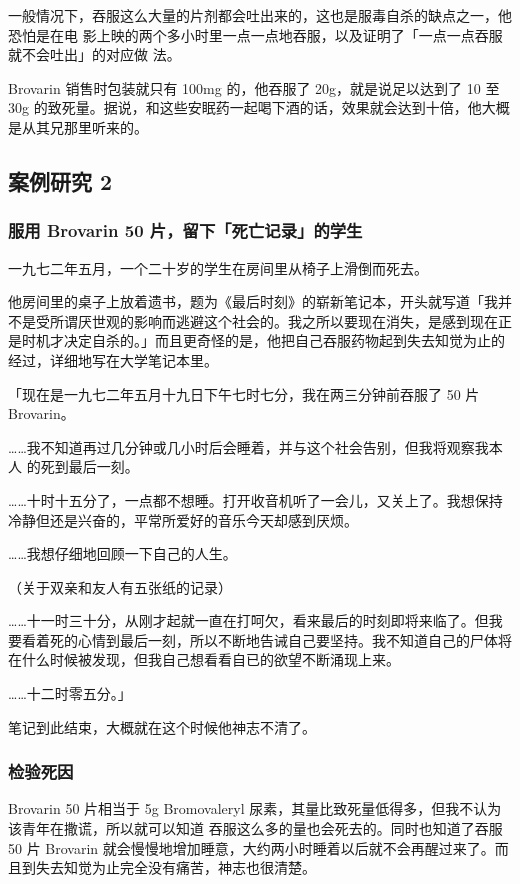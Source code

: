 \documentclass[UTF8]{ctexart}
\begin{document}
一般情况下，吞服这么大量的片剂都会吐出来的，这也是服毒自杀的缺点之一，他恐怕是在电
影上映的两个多小时里一点一点地吞服，以及证明了「一点一点吞服就不会吐出」的对应做
法。

Brovarin 销售时包装就只有 100mg 的，他吞服了 20g，就是说足以达到了 10 至 30g 的致死量。据说，和这些安眠药一起喝下酒的话，效果就会达到十倍，他大概是从其兄那里听来的。

\subsection{案例研究 2}

\subsubsection*{服用 Brovarin 50 片，留下「死亡记录」的学生}

一九七二年五月，一个二十岁的学生在房间里从椅子上滑倒而死去。

他房间里的桌子上放着遗书，题为《最后时刻》的崭新笔记本，开头就写道「我并不是受所谓厌世观的影响而逃避这个社会的。我之所以要现在消失，是感到现在正是时机才决定自杀的。」而且更奇怪的是，他把自己吞服药物起到失去知觉为止的经过，详细地写在大学笔记本里。

「现在是一九七二年五月十九日下午七时七分，我在两三分钟前吞服了 50 片 Brovarin。

……我不知道再过几分钟或几小时后会睡着，并与这个社会告别，但我将观察我本人 的死到最后一刻。

……十时十五分了，一点都不想睡。打开收音机听了一会儿，又关上了。我想保持冷静但还是兴奋的，平常所爱好的音乐今天却感到厌烦。

……我想仔细地回顾一下自己的人生。

（关于双亲和友人有五张纸的记录）

……十一时三十分，从刚才起就一直在打呵欠，看来最后的时刻即将来临了。但我要看着死的心情到最后一刻，所以不断地告诫自己要坚持。我不知道自己的尸体将在什么时候被发现，但我自己想看看自已的欲望不断涌现上来。

……十二时零五分。」

笔记到此结束，大概就在这个时候他神志不清了。

\subsubsection*{检验死因}

Brovarin 50 片相当于 5g Bromovaleryl 尿素，其量比致死量低得多，但我不认为该青年在撒谎，所以就可以知道 吞服这么多的量也会死去的。同时也知道了吞服 50 片 Brovarin 就会慢慢地增加睡意，大约两小时睡着以后就不会再醒过来了。而且到失去知觉为止完全没有痛苦，神志也很清楚。
\end{document}
